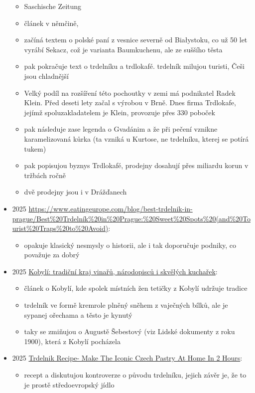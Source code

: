 \begin{itemize}
  \begin{itemize}
  \tightlist
  \item
    Saschische Zeitung
  \item
    článek v němčině,
  \item
    začíná textem o polské paní z vesnice severně od Białystoku, co už
    50 let vyrábí Sekacz, což je varianta Baumkuchenu, ale ze suššího
    těsta
  \item
    pak pokračuje text o trdelníku a trdlokafé. trdelník milujou
    turisti, Češi jsou chladnější
  \item
    Velký podíl na rozšíření této pochoutky v zemi má podnikatel Radek
    Klein. Před deseti lety začal s výrobou v Brně. Dnes firma
    Trdlokafe, jejímž spoluzakladatelem je Klein, provozuje přes 330
    poboček
  \item
    pak následuje zase legenda o Gvadánim a že při pečení vznikne
    karamelizovaná kůrka (ta vzniká u Kurtose, ne trdelníku, kterej se
    potírá tukem)
  \item
    pak popisujou byznys Trdlokafé, prodejny dosahují přes miliardu
    korun v tržbách ročně
  \item
    dvě prodejny jsou i v Drážďanech
  \end{itemize}
\item
  2025
  \url{https://www.eatingeurope.com/blog/best-trdelnik-in-prague/Best\%20Trdelník\%20in\%20Prague:\%20Sweet\%20Spots\%20(and\%20Tourist\%20Traps\%20to\%20Avoid)}:

  \begin{itemize}
  \tightlist
  \item
    opakuje klasický nesmysly o historii, ale i tak doporučuje podniky,
    co považuje za dobrý
  \end{itemize}
\item
  2025
  \href{https://www.lideazeme.cz/clanek/lideazeme-cz-cesko-jihovychod/131289/kobyli-tradicni-kraj-vinaru-narodopiscu-i-skvelych-kucharek.html}{Kobylí:
  tradiční kraj vinařů, národopisců i skvělých kuchařek}:

  \begin{itemize}
  \tightlist
  \item
    článek o Kobylí, kde spolek místních žen tetičky z Kobylí udržuje
    tradice
  \item
    trdelník ve formě kremrole plněný sněhem z vaječných bílků, ale je
    sypanej ořechama a těsto je kynutý
  \item
    taky se zmiňujou o Augustě Šebestový (viz Lidské dokumenty z roku
    1900), která z Kobylí pocházela
  \end{itemize}
\item
  2025
  \href{https://thefoodhog.com/czech-trdelnik-recipe-in-2-hours/}{Trdelnik
  Recipe- Make The Iconic Czech Pastry At Home In 2 Hours}:

  \begin{itemize}
  \tightlist
  \item
    recept a diskutujou kontroverze o původu trdelníku, jejich závěr je,
    že to je prostě středoevropský jídlo
  \end{itemize}
\end{itemize}


